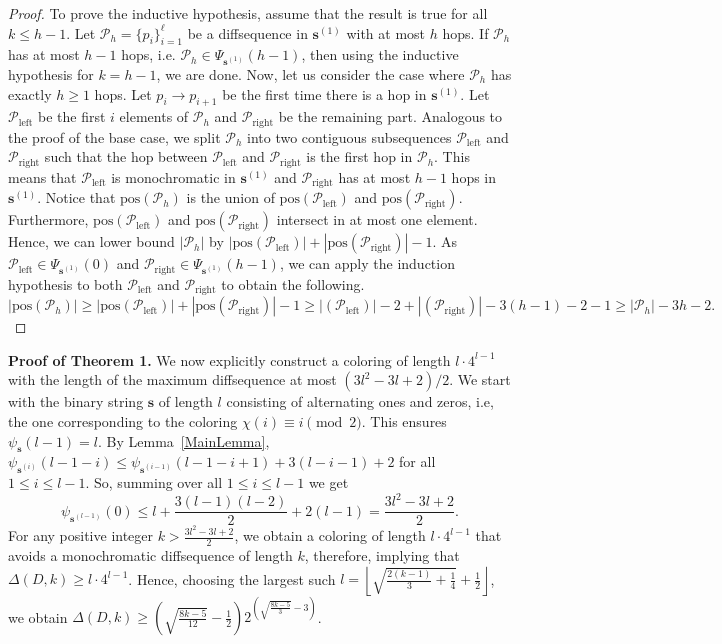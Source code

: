 \documentclass[11pt]{article}
\begin{document}
\begin{proof}
To prove the inductive hypothesis, assume that the result is true for all $k\leq h-1$. Let $\mathcal{P}_h=\{p_i\}^\ell_{i=1}$ be a diffsequence in $\mathbf{s}^{(1)}$ with at most $h$ hops. If $\mathcal{P}_h$ has at most $h-1$ hops, i.e. $\mathcal{P}_h \in \Psi_{\mathbf{s}^{(1)}}(h-1)$, then using the inductive hypothesis for $k = h-1$, we are done. Now, let us consider the case where $\mathcal{P}_h$ has exactly $h \ge 1$ hops. Let $p_i\to p_{i+1}$ be the first time there is a hop in $\mathbf{s}^{(1)}$. Let $\mathcal{P}_{\text{left}}$ be the first $i$ elements of $\mathcal{P}_h$ and $\mathcal{P}_{\text{right}}$ be the remaining part. Analogous to the proof of the base case, we split $\mathcal{P}_h$ into two contiguous subsequences $\mathcal{P}_{\text{left}}$ and $\mathcal{P}_{\text{right}}$ such that the hop between $\mathcal{P}_{\text{left}}$ and $\mathcal{P}_{\text{right}}$ is the first hop in $\mathcal{P}_h$. This means that $\mathcal{P}_{\text{left}}$ is monochromatic in $\mathbf{s}^{(1)}$ and $\mathcal{P}_{\text{right}}$ has at most $h-1$ hops in $\mathbf{s}^{(1)}$. Notice that $\text{pos}(\mathcal{P}_h)$ is the union of $\text{pos}(\mathcal{P}_{\text{left}})$ and $\text{pos}(\mathcal{P}_{\text{right}})$. Furthermore, $\text{pos}(\mathcal{P}_{\text{left}})$ and $\text{pos}(\mathcal{P}_{\text{right}})$ intersect in at most one element. Hence, we can lower bound $|\mathcal{P}_h|$ by $|\text{pos}(\mathcal{P}_{\text{left}})|+|\text{pos}(\mathcal{P}_{\text{right}})|-1$. As $\mathcal{P}_{\text{left}}\in \Psi_{\mathbf{s}^{(1)}}(0)$ and $\mathcal{P}_{\text{right}}\in \Psi_{\mathbf{s}^{(1)}}(h-1)$, we can apply the induction hypothesis to both $\mathcal{P}_{\text{left}}$ and $\mathcal{P}_{\text{right}}$ to obtain the following. $|\text{pos}(\mathcal{P}_h)| \ge |\text{pos}(\mathcal{P}_{\text{left}})|+|\text{pos}(\mathcal{P}_{\text{right}})|-1 \ge |(\mathcal{P}_{\text{left}})|-2+|(\mathcal{P}_{\text{right}})|-3(h-1)-2-1 \ge |\mathcal{P}_h|-3h-2.$
\end{proof}
\noindent
\textbf{Proof of Theorem 1.} 
We now explicitly construct a coloring of length $l \cdot4^{l-1}$ with the length of the maximum diffsequence at most $(3l^2-3l+2)/2$. We start with the binary string $\mathbf{s}$ of length $l$ consisting of alternating ones and zeros, i.e, the one corresponding to the coloring $\chi(i)\equiv i\pmod{2}$. This ensures $\psi_{\mathbf{s}}(l-1)=l$. By Lemma~\ref{MainLemma}, $\psi_{\mathbf{s}^{(i)}}(l-1-i)\le \psi_{\mathbf{s}^{(i-1)}}(l-1-i+1)+3(l-i-1)+2$ for all $1\le i\le l-1$.
So, summing over all $1\le i\le l-1$ we get
\begin{equation*}
    \psi_{\mathbf{s}^{(l-1)}}(0)\le l+\frac{3(l-1)(l-2)}{2}+2(l-1)=\frac{3l^2-3l+2}{2}.
\end{equation*}
For any positive integer $k>\frac{3l^2-3l+2}{2}$, we obtain a coloring of length $l\cdot 4^{l-1}$ that avoids a monochromatic diffsequence of length $k$, therefore, implying that $\Delta(D,k)\ge l\cdot4^{l-1}$. Hence, choosing the largest such $l=\left\lfloor\sqrt{\frac{2(k-1)}{3}+\frac{1}{4}}+\frac{1}{2}\right\rfloor$, we obtain $\Delta(D,k)\ge\left(\sqrt{\frac{8k-5}{12}}-\frac12\right)2^{\left(\sqrt{\frac{8k-5}{3}}-3\right)}$.
\end{document}
